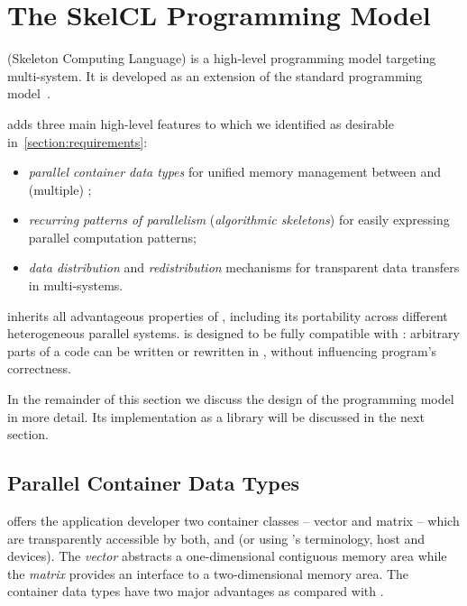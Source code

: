 \section{The SkelCL Programming Model}
\label{section:skelcl-programming-model}
\SkelCL (Skeleton Computing Language) is a high-level programming model targeting multi-\GPU system.
It is developed as an extension of the standard \OpenCL programming model~\cite{OpenCL}.

\SkelCL adds three main high-level features to \OpenCL which we identified as desirable in~\autoref{section:requirements}:

\begin{itemize}
  \item \emph{parallel container data types} for unified memory management between \CPU and (multiple) \GPUs;
  \item \emph{recurring patterns of parallelism} (\aka \emph{algorithmic skeletons}) for easily expressing parallel computation patterns;
  \item \emph{data distribution} and \emph{redistribution} mechanisms for transparent data transfers in multi-\GPU systems.
\end{itemize}

\noindent
\SkelCL inherits all advantageous properties of \OpenCL, including its portability across different heterogeneous parallel systems.
\SkelCL is designed to be fully compatible with \OpenCL: arbitrary parts of a \SkelCL code can be written or rewritten in \OpenCL, without influencing program's correctness.

In the remainder of this section we discuss the design of the \SkelCL programming model in more detail.
Its implementation as a \Cpp library will be discussed in the next section.

\subsection{Parallel Container Data Types}
\label{section:skelcl-programming-model:container}
\SkelCL offers the application developer two container classes -- vector and matrix -- which are transparently accessible by both, \CPU and \GPUs (or using \OpenCL's terminology, host and devices).
The \emph{vector} abstracts a one-dimensional contiguous memory area while the \emph{matrix} provides an interface to a two-dimensional memory area.
The \SkelCL container data types have two major advantages as compared with \OpenCL.

